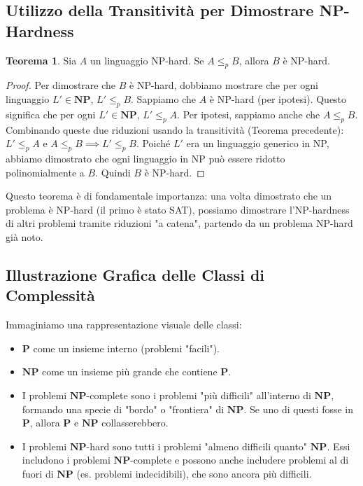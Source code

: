 \documentclass[a4paper]{article}
\theoremstyle{definition} %
\newtheorem{theorem}{Teorema}
\begin{document}
\subsection{Utilizzo della Transitivit\`a per Dimostrare NP-Hardness}

\begin{theorem}
Sia $A$ un linguaggio NP-hard. Se $A \le_p B$, allora $B$ è NP-hard.
\end{theorem}

\begin{proof}
Per dimostrare che $B$ è NP-hard, dobbiamo mostrare che per ogni linguaggio $L' \in \mathbf{NP}$, $L' \le_p B$.
Sappiamo che $A$ è NP-hard (per ipotesi). Questo significa che per ogni $L' \in \mathbf{NP}$, $L' \le_p A$.
Per ipotesi, sappiamo anche che $A \le_p B$.
Combinando queste due riduzioni usando la transitività (Teorema precedente): $L' \le_p A$ e $A \le_p B \implies L' \le_p B$.
Poiché $L'$ era un linguaggio generico in NP, abbiamo dimostrato che ogni linguaggio in NP può essere ridotto polinomialmente a $B$. Quindi $B$ è NP-hard.
\end{proof}

Questo teorema è di fondamentale importanza: una volta dimostrato che un problema è NP-hard (il primo è stato SAT), possiamo dimostrare l'NP-hardness di altri problemi tramite riduzioni "a catena", partendo da un problema NP-hard già noto.

\subsection{Illustrazione Grafica delle Classi di Complessità}

Immaginiamo una rappresentazione visuale delle classi:
\begin{itemize}
    \item $\mathbf{P}$ come un insieme interno (problemi "facili").
    \item $\mathbf{NP}$ come un insieme più grande che contiene $\mathbf{P}$.
    \item I problemi $\mathbf{NP}$-complete sono i problemi "più difficili" all'interno di $\mathbf{NP}$, formando una specie di "bordo" o "frontiera" di $\mathbf{NP}$. Se uno di questi fosse in $\mathbf{P}$, allora $\mathbf{P}$ e $\mathbf{NP}$ collasserebbero.
    \item I problemi $\mathbf{NP}$-hard sono tutti i problemi "almeno difficili quanto" $\mathbf{NP}$. Essi includono i problemi $\mathbf{NP}$-complete e possono anche includere problemi al di fuori di $\mathbf{NP}$ (es. problemi indecidibili), che sono ancora più difficili.
\end{itemize}
\end{document}
